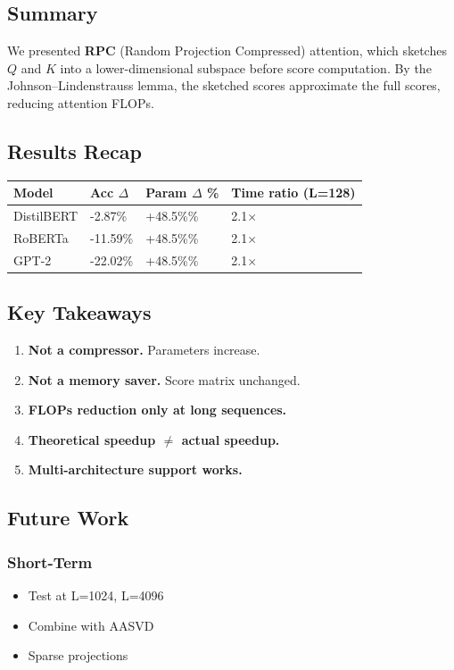 \subsection{Summary}

We presented \textbf{RPC} (Random Projection Compressed) attention, which sketches 
$Q$ and $K$ into a lower-dimensional subspace before score computation. 
By the Johnson--Lindenstrauss lemma, the sketched scores approximate the 
full scores, reducing attention FLOPs.

\subsection{Results Recap}

\begin{table}[H]
\centering
\small
\begin{tabular}{llll}
\toprule
\textbf{Model} & \textbf{Acc $\Delta$} & \textbf{Param $\Delta$ \%} & \textbf{Time ratio (L=128)} \\
\midrule
DistilBERT & -2.87\% & +48.5\%\% & 2.1$\times$ \\
RoBERTa & -11.59\% & +48.5\%\% & 2.1$\times$ \\
GPT-2 & -22.02\% & +48.5\%\% & 2.1$\times$ \\
\bottomrule
\end{tabular}
\end{table}

\subsection{Key Takeaways}

\begin{enumerate}
\item \textbf{Not a compressor.} Parameters increase.
\item \textbf{Not a memory saver.} Score matrix unchanged.
\item \textbf{FLOPs reduction only at long sequences.}
\item \textbf{Theoretical speedup $\ne$ actual speedup.}
\item \textbf{Multi-architecture support works.}

\end{enumerate}
\subsection{Future Work}

\subsubsection{Short-Term}
\begin{itemize}
\item Test at L=1024, L=4096
\item Combine with AASVD
\item Sparse projections

\end{itemize}
